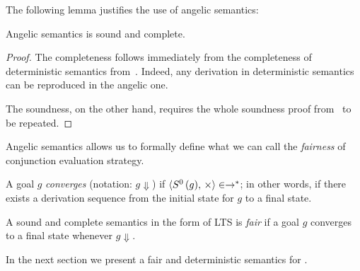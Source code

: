 The following lemma justifies the use of angelic semantics:

\begin{lemma}
  Angelic semantics is sound and complete.
\end{lemma}
\begin{proof}
  The completeness follows immediately from the completeness of deterministic semantics from~\cite{fair:semantics}. Indeed, any derivation in deterministic semantics can be reproduced in
  the angelic one.

  The soundness, on the other hand, requires the whole soundness proof from~\cite{fair:semantics} to be repeated. 
\end{proof}

Angelic semantics allows us to formally define what we can call the \emph{fairness} of conjunction evaluation strategy. 

\begin{definition}[Convergence]
  A goal $g$ \emph{converges} (notation: $g\Downarrow$) if $\langle S^0\,(g),\,\times \rangle\in\rightarrow^*$; in other words, if there exists a derivation sequence from the initial state for $g$ to a
  final state.
\end{definition}

\begin{definition}[Fairness]
  A sound and complete semantics in the form of LTS is \emph{fair} if a goal $g$ converges to a final state whenever $g\Downarrow$. 
\end{definition}

In the next section we present a fair and deterministic semantics for \mk.

